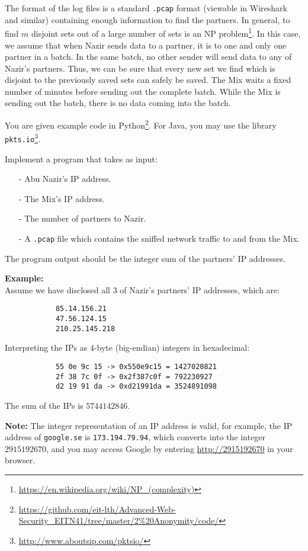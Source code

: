 \documentclass{article}
\begin{document}
\begin{description}
{		The format of the log files is a standard \texttt{.pcap} format (viewable in Wireshark and similar) containing enough information
		to find the partners. In general, to find $m$ disjoint sets out of a large number of sets is an 
		NP problem\footnote{\url{https://en.wikipedia.org/wiki/NP_(complexity)}}. In this case, we assume that when Nazir sends data to a partner,
		it is to one and only one partner in a batch. In the same batch, no other sender will send data to any of Nazir's partners. Thus,
		we can be sure that every new set we find which is disjoint to the previously saved sets can safely be saved.
		The Mix waits a fixed number of minutes before sending out the complete batch. While the Mix is sending out the batch, there is no
		data coming into the batch.

		You are given example code in Python\footnote{\url{https://github.com/eit-lth/Advanced-Web-Security_EITN41/tree/master/2\%20Anonymity/code/}}.
		For Java, you may use the library \texttt{pkts.io}\footnote{\url{http://www.aboutsip.com/pktsio/}}.

		Implement a program that takes as input:
		\begin{itemize}
			\item[-] Abu Nazir's IP address.
			\item[-] The Mix's IP address.
			\item[-] The number of partners to Nazir.
			\item[-] A \texttt{.pcap} file which contains the sniffed network traffic to and from the Mix.
		\end{itemize}
		The program output should be the integer sum of the partners' IP addresses.

		\textbf{Example:}\\
		Assume we have disclosed all 3 of Nazir's partners' IP addresses, which are:
		\begin{verbatim}
			85.14.156.21
			47.56.124.15
			210.25.145.218
		\end{verbatim}
		Interpreting the IPs as 4-byte (big-endian) integers in hexadecimal:
		\begin{verbatim}
			55 0e 9c 15 -> 0x550e9c15 = 1427020821
			2f 38 7c 0f -> 0x2f387c0f = 792230927
			d2 19 91 da -> 0xd21991da = 3524891098
		\end{verbatim}
		The sum of the IPs is $5744142846$.

		\textbf{Note:} The integer representation of an IP address is valid, for example, the IP address of \texttt{google.se}
		is \texttt{173.194.79.94}, which converts into the integer $2915192670$, and you may access Google by entering
		\url{http://2915192670} in your browser.

}
\end{description}
\end{document}
